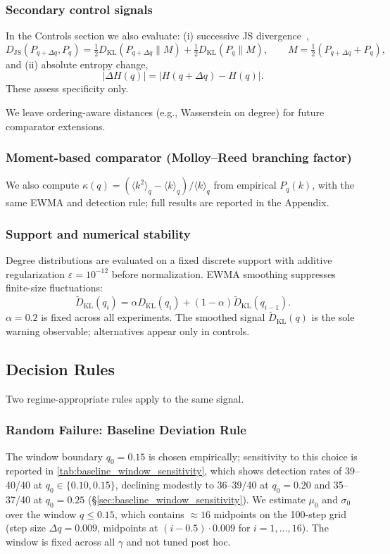\documentclass{nws}
\begin{document}
\subsubsection*{Secondary control signals}
In the Controls section we also evaluate: (i) successive JS divergence~\citep{lin1991js},
\[
D_{\mathrm{JS}}(P_{q+\Delta q},P_q)=\tfrac12 D_{\mathrm{KL}}(P_{q+\Delta q}\|M)+\tfrac12
D_{\mathrm{KL}}(P_q\|M),
\qquad
M=\tfrac12(P_{q+\Delta q}+P_q),
\]
and (ii) absolute entropy change,
\[
|\Delta H(q)| = \big|H(q+\Delta q)-H(q)\big|.
\]
These assess specificity only.

We leave ordering-aware distances (e.g., Wasserstein on degree) for future comparator
extensions.

\subsubsection*{Moment-based comparator (Molloy--Reed branching factor)}
We also compute $\kappa(q)=(\langle k^2\rangle_q-\langle k\rangle_q)/\langle k\rangle_q$
from empirical $P_q(k)$, with the same EWMA and detection rule; full results are reported in the Appendix.

\subsubsection*{Support and numerical stability}
Degree distributions are evaluated on a fixed discrete support with additive
regularization $\varepsilon = 10^{-12}$ before normalization. EWMA smoothing
suppresses finite-size fluctuations:
\[
\tilde{D}_{\mathrm{KL}}(q_i)
=
\alpha D_{\mathrm{KL}}(q_i)
+
(1-\alpha)\tilde{D}_{\mathrm{KL}}(q_{i-1}).
\]
$\alpha=0.2$ is fixed across all experiments. The smoothed signal $\tilde{D}_{\mathrm{KL}}(q)$ is
the sole warning observable; alternatives appear only in controls.

\subsection{Decision Rules}
\label{sec:early_warning_criteria}
Two regime-appropriate rules apply to the same signal.

\subsubsection{Random Failure: Baseline Deviation Rule}
The window boundary $q_0 = 0.15$ is chosen empirically; sensitivity to this choice is
reported in \autoref{tab:baseline_window_sensitivity}, which shows detection rates of
39--40/40 at $q_0 \in \{0.10, 0.15\}$, declining modestly to 36--39/40 at $q_0 = 0.20$
and 35--37/40 at $q_0 = 0.25$ (\S\ref{sec:baseline_window_sensitivity}).
We estimate $\mu_0$ and $\sigma_0$ over the window $q \le 0.15$,
which contains $\approx16$ midpoints on the 100-step grid (step size $\Delta q=0.009$,
midpoints at $(i-0.5)\cdot0.009$ for $i=1,\ldots,16$).
The window is fixed across all $\gamma$ and not tuned post hoc.
\end{document}

